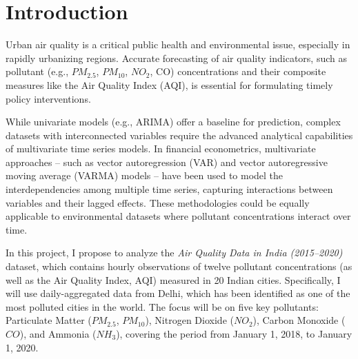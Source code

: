 \documentclass[fleqn,10pt]{SelfArx} %
\affiliation{\textsuperscript{1}\textit{Department of Econometric Analysis, Faculty of Mathematics and Informatics, Vilnius University}} %
\affiliation{*\textbf{Corresponding author}: aleksandr.smoliakov@mif.stud.vu.lt} %
\newlength{\tocsep}
\begin{document}
\flushbottom %

\maketitle %

\tableofcontents %

\thispagestyle{empty} %


\section*{Introduction} %


Urban air quality is a critical public health and environmental issue, especially in rapidly urbanizing regions. Accurate forecasting of air quality indicators, such as pollutant (e.g., $PM_{2.5}$, $PM_{10}$, $NO_{2}$, CO) concentrations and their composite measures like the Air Quality Index (AQI), is essential for formulating timely policy interventions.

While univariate models (e.g., ARIMA) offer a baseline for prediction, complex datasets with interconnected variables require the advanced analytical capabilities of multivariate time series models. In financial econometrics, multivariate approaches -- such as vector autoregression (VAR) and vector autoregressive moving average (VARMA) models -- have been used to model the interdependencies among multiple time series, capturing interactions between variables and their lagged effects. These methodologies could be equally applicable to environmental datasets where pollutant concentrations interact over time.

In this project, I propose to analyze the \emph{Air Quality Data in India (2015--2020)} dataset, which contains hourly observations of twelve pollutant concentrations (as well as the Air Quality Index, AQI) measured in 20 Indian cities. Specifically, I will use daily-aggregated data from Delhi, which has been identified as one of the most polluted cities in the world. The focus will be on five key pollutants: Particulate Matter ($PM_{2.5}$, $PM_{10}$), Nitrogen Dioxide ($NO_2$), Carbon Monoxide ($CO$), and Ammonia ($NH_3$), covering the period from January 1, 2018, to January 1, 2020.
\end{document}
